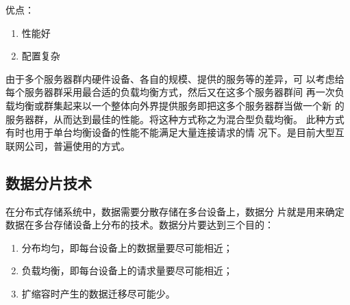 \noindent
优点：
\begin{enumerate}
	\item 性能好
	\item 配置复杂
\end{enumerate}

由于多个服务器群内硬件设备、各自的规模、提供的服务等的差异，可
以考虑给每个服务器群采用最合适的负载均衡方式，然后又在这多个服务器群间
再一次负载均衡或群集起来以一个整体向外界提供服务即把这多个服务器群当做一个新
的服务器群，从而达到最佳的性能。将这种方式称之为混合型负载均衡。
此种方式有时也用于单台均衡设备的性能不能满足大量连接请求的情
况下。是目前大型互联网公司，普遍使用的方式。
\subsection{数据分片技术}
在分布式存储系统中，数据需要分散存储在多台设备上，数据分
片就是用来确定数据在多台存储设备上分布的技术。数据分片要达到三个目的：
\begin{enumerate}
	\item 分布均匀，即每台设备上的数据量要尽可能相近；
	\item 负载均衡，即每台设备上的请求量要尽可能相近；
	\item 扩缩容时产生的数据迁移尽可能少。
\end{enumerate}

